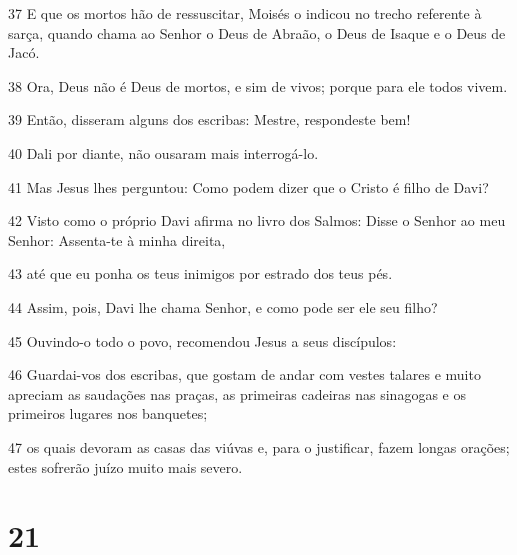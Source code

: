 \par 37 E que os mortos hão de ressuscitar, Moisés o indicou no trecho referente à sarça, quando chama ao Senhor o Deus de Abraão, o Deus de Isaque e o Deus de Jacó.
\par 38 Ora, Deus não é Deus de mortos, e sim de vivos; porque para ele todos vivem.
\par 39 Então, disseram alguns dos escribas: Mestre, respondeste bem!
\par 40 Dali por diante, não ousaram mais interrogá-lo.
\par 41 Mas Jesus lhes perguntou: Como podem dizer que o Cristo é filho de Davi?
\par 42 Visto como o próprio Davi afirma no livro dos Salmos: Disse o Senhor ao meu Senhor: Assenta-te à minha direita,
\par 43 até que eu ponha os teus inimigos por estrado dos teus pés.
\par 44 Assim, pois, Davi lhe chama Senhor, e como pode ser ele seu filho?
\par 45 Ouvindo-o todo o povo, recomendou Jesus a seus discípulos:
\par 46 Guardai-vos dos escribas, que gostam de andar com vestes talares e muito apreciam as saudações nas praças, as primeiras cadeiras nas sinagogas e os primeiros lugares nos banquetes;
\par 47 os quais devoram as casas das viúvas e, para o justificar, fazem longas orações; estes sofrerão juízo muito mais severo.

\chapter{21}

